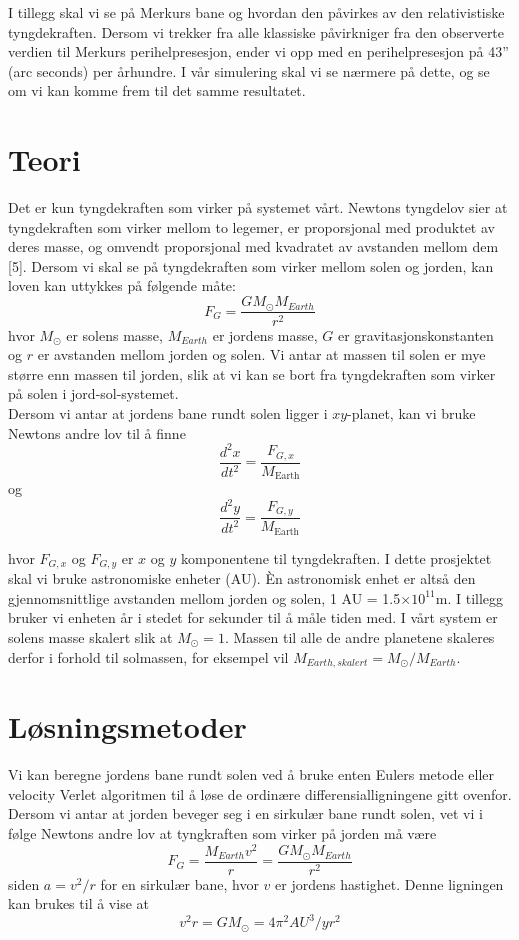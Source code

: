 \documentclass[11pt,a4paper]{article}
\begin{document}
I tillegg skal vi se på Merkurs bane og hvordan den påvirkes av den relativistiske tyngdekraften. Dersom vi trekker fra alle klassiske påvirkniger fra den observerte verdien til Merkurs perihelpresesjon, ender vi opp med en perihelpresesjon på 43'' (arc seconds) per århundre. I vår simulering skal vi se nærmere på dette, og se om vi kan komme frem til det samme resultatet.

\section{Teori}
Det er kun tyngdekraften som virker på systemet vårt. Newtons tyngdelov sier at tyngdekraften som virker mellom to legemer, er proporsjonal med produktet av deres masse, og omvendt proporsjonal med kvadratet av avstanden mellom dem [5]. Dersom vi skal se på tyngdekraften som virker mellom solen og jorden, kan loven kan uttykkes på følgende måte:
\begin{equation}
F_G = \frac{GM_{\odot}M_{Earth}}{r^2}
\end{equation}
hvor $M_{\odot}$ er solens masse, $M_{Earth}$ er jordens masse, $G$ er gravitasjonskonstanten og $r$ er avstanden mellom jorden og solen. Vi antar at massen til solen er mye større enn massen til jorden, slik at vi kan se bort fra tyngdekraften som virker på solen i jord-sol-systemet. \\

Dersom vi antar at jordens bane rundt solen ligger i $xy$-planet, kan vi bruke Newtons andre lov til å finne
\begin{equation}
 \frac{d^2x}{dt^2}=\frac{F_{G,x}}{M_{\mathrm{Earth}}}
\end{equation}
og 
\begin{equation}
\frac{d^2y}{dt^2}=\frac{F_{G,y}}{M_{\mathrm{Earth}}}
\end{equation}

hvor $F_{G,x}$ og $F_{G,y}$ er $x$ og $y$ komponentene til tyngdekraften. I dette prosjektet skal vi bruke astronomiske enheter (AU). Èn astronomisk enhet er altså den gjennomsnittlige avstanden mellom jorden og solen, 1 AU = 1.5$\times10^{11}$m. I tillegg bruker vi enheten år i stedet for sekunder til å måle tiden med. I vårt system er solens masse skalert slik at $M_{\odot} = 1$. Massen til alle de andre planetene skaleres derfor i forhold til solmassen, for eksempel vil $M_{Earth,skalert} = M_{\odot}/M_{Earth}$. 


\section{Løsningsmetoder}
Vi kan beregne jordens bane rundt solen ved å bruke enten Eulers metode eller velocity Verlet algoritmen til å løse de ordinære differensialligningene gitt ovenfor. Dersom vi antar at jorden beveger seg i en sirkulær bane rundt solen, vet vi i følge Newtons andre lov at tyngkraften som virker på jorden må være
\[F_G = \frac{M_{Earth}v^2}{r} = \frac{GM_{\odot}M_{Earth}}{r^2}  \]
siden $a = v^2/r$ for en sirkulær bane, hvor $v$ er jordens hastighet. Denne ligningen kan brukes til å vise at 
\[v^2r = GM_{\odot} = 4\pi^2 AU^3/yr^2  \]
\end{document}
